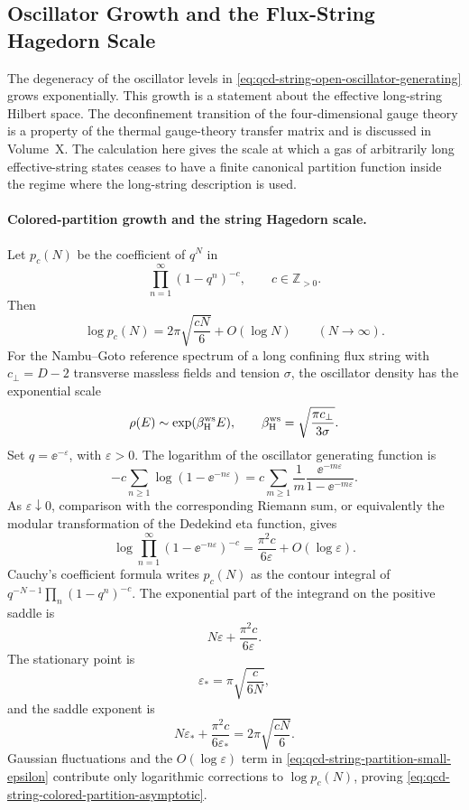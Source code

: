 \subsection{Oscillator Growth and the Flux-String Hagedorn Scale}

The degeneracy of the oscillator levels in
\eqref{eq:qcd-string-open-oscillator-generating} grows exponentially.  This
growth is a statement about the effective long-string Hilbert space.  The
deconfinement transition of the four-dimensional gauge theory is a property of
the thermal gauge-theory transfer matrix and is discussed in Volume~X.  The
calculation here gives the scale at which a gas of arbitrarily long
effective-string states ceases to have a finite canonical partition function
inside the regime where the long-string description is used.

\paragraph{Colored-partition growth and the string Hagedorn scale.}
Let \(p_c(N)\) be the coefficient of \(q^N\) in
\[
  \prod_{n=1}^\infty(1-q^n)^{-c},
  \qquad c\in\mathbb Z_{>0}.
\]
Then
\begin{equation}
  \log p_c(N)
  =
  2\pi\sqrt{\frac{cN}{6}}+O(\log N)
  \qquad (N\to\infty).
  \label{eq:qcd-string-colored-partition-asymptotic}
\end{equation}
For the Nambu--Goto reference spectrum of a long confining flux string with
\(c_\perp=D-2\) transverse massless fields and tension \(\sigma\), the
oscillator density has the exponential scale
\begin{equation}
  \rho(E)\sim \exp(\beta_{\rm H}^{\rm ws} E),
  \qquad
  \beta_{\rm H}^{\rm ws}
  =
  \sqrt{\frac{\pi c_\perp}{3\sigma}} .
  \label{eq:qcd-string-worldsheet-hagedorn-beta}
\end{equation}
Set \(q=\ee^{-\varepsilon}\), with \(\varepsilon>0\).  The logarithm of the
oscillator generating function is
\[
  -c\sum_{n\ge1}\log(1-\ee^{-n\varepsilon})
  =
  c\sum_{m\ge1}\frac1m\frac{\ee^{-m\varepsilon}}{1-\ee^{-m\varepsilon}} .
\]
As \(\varepsilon\downarrow0\), comparison with the corresponding Riemann sum,
or equivalently the modular transformation of the Dedekind eta function, gives
\begin{equation}
  \log\prod_{n=1}^{\infty}(1-\ee^{-n\varepsilon})^{-c}
  =
  \frac{\pi^2 c}{6\varepsilon}+O(\log\varepsilon).
  \label{eq:qcd-string-partition-small-epsilon}
\end{equation}
Cauchy's coefficient formula writes \(p_c(N)\) as the contour integral of
\(q^{-N-1}\prod_n(1-q^n)^{-c}\).  The exponential part of the integrand on the
positive saddle is
\[
  N\varepsilon+\frac{\pi^2 c}{6\varepsilon}.
\]
The stationary point is
\[
  \varepsilon_*=\pi\sqrt{\frac{c}{6N}},
\]
and the saddle exponent is
\[
  N\varepsilon_*+\frac{\pi^2 c}{6\varepsilon_*}
  =
  2\pi\sqrt{\frac{cN}{6}} .
\]
Gaussian fluctuations and the \(O(\log\varepsilon)\) term in
\eqref{eq:qcd-string-partition-small-epsilon} contribute only logarithmic
corrections to \(\log p_c(N)\), proving
\eqref{eq:qcd-string-colored-partition-asymptotic}.

